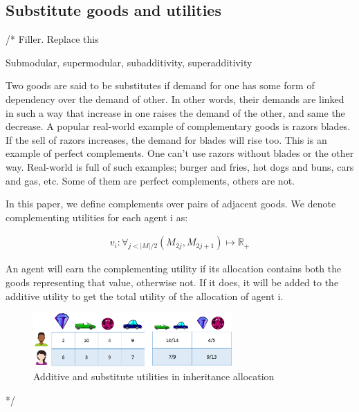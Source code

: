 \subsection{Substitute goods and utilities}
\label{section_substitute}

/* Filler. Replace this

Submodular, supermodular, subadditivity, superadditivity

Two goods are said to be substitutes if demand for one has some form of dependency over the demand of other. In other words, their demands are linked in such a way that increase in one raises the demand of the other, and same the decrease. A popular real-world example of complementary goods is razors blades. If the sell of razors increases, the demand for blades will rise too. This is an example of perfect complements. One can't use razors without blades or the other way. Real-world is full of such examples; burger and fries, hot dogs and buns, cars and gas, etc. Some of them are perfect complements, others are not.

In this paper, we define complements over pairs of adjacent goods. We denote complementing utilities for each agent i as: 

\begin{gather}
    v_i: \forall_{j < |M|/2} (M_{2j}, M_{2j+1})\mapsto \mathbb{R_+}
\end{gather}

An agent will earn the complementing utility if its allocation contains both the goods representing that value, otherwise not. If it does, it will be added to the additive utility to get the total utility of the allocation of agent i.

\begin{figure}
\includegraphics[width=3in]{images/substitute_values.png}
\caption{Additive and substitute utilities in inheritance allocation}
\end{figure}

*/

